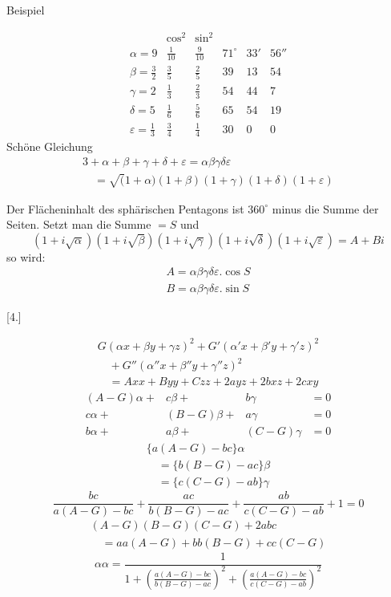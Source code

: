 Beispiel



\[
\begin{array}{lccrrr} &\cos^{2}&\sin^{2}&&&\\[9pt] \alpha=9&\frac{1}{10}&\frac{9}{10}&71^{\circ}&33'&56''\\[9pt] \beta=\frac{3}{2}&\frac{3}{5}&\frac{2}{5}&39&13&54\\[9pt] \gamma=2&\frac{1}{3}&\frac{2}{3}&54&44&7\\[9pt] \delta=5&\frac{1}{6}&\frac{5}{6}&65&54&19\\[9pt] \varepsilon=\frac{1}{3}&\frac{3}{4}&\frac{1}{4}&30&0&0 \end{array}
\]
Schöne Gleichung
\[
\begin{gathered}3+\alpha+\beta+\gamma+\delta+\varepsilon =\alpha\beta\gamma\delta\varepsilon \\[9pt]\quad{}=\surd(1+\alpha)(1+\beta)(1+\gamma)(1+\delta)(1+\varepsilon)\end{gathered}
\]
\par Der Flächeninhalt des sphärischen Pentagons ist $360^{\circ}$ minus die Summe der Seiten.
Setzt man die Summe $=S$ und
\[
(1+i\surd\alpha)(1+i\surd\beta)(1+i\surd\gamma) (1+i\surd\delta)(1+i\surd\varepsilon)=A+Bi
\]
so wird:
\[
\begin{gathered} A=\alpha\beta\gamma\delta\varepsilon.\cos S\\[9pt] B=\alpha\beta\gamma\delta\varepsilon.\sin S \end{gathered}
\]

\par\medskip{}\centerline{[4.]}\nobreak\smallskip
\[
\begin{gathered} G(\alpha x+\beta y+\gamma z)^2 +G'(\alpha'x+\beta'y+\gamma'z)^2 \\[9pt]\quad{}+G''(\alpha''x+\beta''y+\gamma''z)^2\\[9pt] \quad=Axx+Byy+Czz+2ayz+2bxz+2cxy \end{gathered}
\]
\[
\begin{array}{rrrr} (A-G)\alpha+&c\beta+&b\gamma&=0\\[9pt] c\alpha+&(B-G)\beta+&a\gamma&=0\\[9pt] b\alpha+&a\beta+&(C-G)\gamma&=0 \end{array}
\]
\[
\begin{gathered}\{a(A-G)-bc\}\alpha\\[9pt]\quad{}=\{b(B-G)-ac\}\beta\\[9pt]\quad{}=\{c(C-G)-ab\}\gamma\end{gathered}
\]
\[
\frac{bc}{a(A-G)-bc}+\frac{ac}{b(B-G)-ac} +\frac{ab}{c(C-G)-ab}+1=0
\]
\[
\begin{gathered}(A-G)(B-G)(C-G)+2abc\\[9pt]\quad{}=aa(A-G)+bb(B-G)+cc(C-G)\end{gathered}
\]
\[
\alpha\alpha=\frac{1}{1+ \left(\frac{a(A-G)-bc}{b(B-G)-ac}\right)^2+ \left(\frac{a(A-G)-bc}{c(C-G)-ab}\right)^2}
\]


